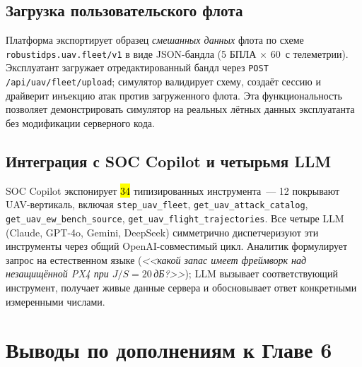 \subsection{Загрузка пользовательского флота}
\label{sec:fleet_upload}

Платформа экспортирует образец \emph{смешанных данных} флота
по схеме \texttt{robustidps.uav.fleet/v1} в виде
JSON-бандла (5 БПЛА $\times$ 60~с телеметрии). Эксплуатант
загружает отредактированный бандл через
\texttt{POST /api/uav/fleet/upload}; симулятор валидирует
схему, создаёт сессию и драйверит инъекцию атак против
загруженного флота. Эта функциональность позволяет
демонстрировать симулятор на реальных лётных данных
эксплуатанта без модификации серверного кода.

\subsection{Интеграция с SOC Copilot и четырьмя LLM}
\label{sec:fleet_copilot}

SOC Copilot экспонирует \hl{34} типизированных инструмента~---
12 покрывают UAV-вертикаль, включая
\texttt{step\_uav\_fleet}, \texttt{get\_uav\_attack\_catalog},
\texttt{get\_uav\_ew\_bench\_source},
\texttt{get\_uav\_flight\_trajectories}. Все четыре LLM
(Claude, GPT-4o, Gemini, DeepSeek) симметрично диспетчеризуют
эти инструменты через общий OpenAI-совместимый цикл. Аналитик
формулирует запрос на естественном языке (\emph{<<какой запас
имеет фреймворк над незащищённой PX4 при $J/S = 20$\,дБ?>>});
LLM вызывает соответствующий инструмент, получает живые данные
сервера и обосновывает ответ конкретными измеренными числами.

\section{Выводы по дополнениям к Главе 6}
\label{sec:ch6_v12_summary}

